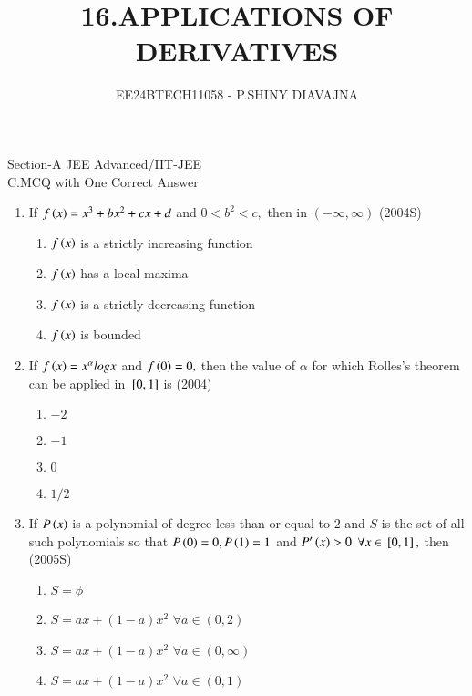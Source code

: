 \documentclass[journal,12pt,twocolumn]{IEEEtran}
\theoremstyle{remark}
\begin{document}

\vspace{3cm}

\title{16.APPLICATIONS OF DERIVATIVES}
\author{EE24BTECH11058 - P.SHINY DIAVAJNA}

\maketitle
\newpage
\bigskip


\renewcommand{\thefigure}{\theenumi}
\renewcommand{\thetable}{\theenumi}

  Section-A JEE Advanced/IIT-JEE\\
  
  C.MCQ with One Correct Answer\\ 
    \begin{enumerate} 
      \item
	  If $f\left(x\right)=x^3+bx^2+cx+d$ and $0<b^2<c,$ then in $(-\infty,\infty)$ \hfill(2004S)
        \begin{enumerate}
	 \item $f\left(x\right)$ is a strictly increasing function
	 \item $f\left(x\right)$ has a local maxima
	 \item $f\left(x\right)$ is a strictly decreasing function
	 \item $f\left(x\right)$ is bounded  \\
        \end{enumerate}
    
 
       \item
	       If $f\left(x\right)=x^{\alpha} logx$ and $f\left(0\right)=0,$ then the value of $\alpha$ for which Rolles's theorem can be applied in ${}\left[0,1\right]$ is 
		    \hfill(2004) 
        \begin {enumerate}
         \item $-2$
         \item $-1$
         \item $0$
         \item $1/2$\\
        \end{enumerate}
   
    
     \item
	     If $P\left(x\right)$ is a polynomial of degree less than or equal to $2$ and $S$ is the set of all such polynomials so that $P\left(0\right)=0,P\left(1\right)=1$ and $P'\left(x\right)>0$ $\forall x \in {}\left[0,1\right],$ then
     \hfill(2005S)
    \begin{enumerate}
        \item  $S=\phi$
        \item  $S=ax+(1-a)x^2$ $\forall a \in (0,2)$
        \item  $S=ax+(1-a)x^2$ $\forall a\in (0,\infty)$
        \item  $S=ax+(1-a)x^2$ $\forall a \in (0,1)$ \\
    \end{enumerate} 
    

\end{enumerate}
\end{document}
